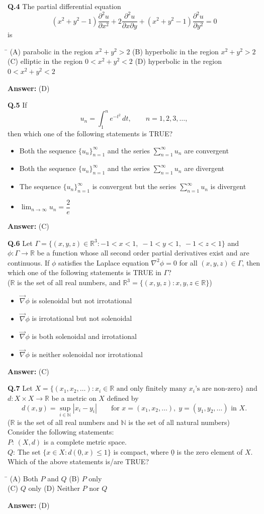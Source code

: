 \documentclass[11pt,a4paper]{article}
\newcommand{\optsfourA}[4]{%
  \begin{tabbing}
    \hspace{0.48\linewidth}\=\kill
    (A) #1 \> (B) #2 \\[2pt]
    (C) #3 \> (D) #4
  \end{tabbing}%
}
\newcommand{\optslistA}[4]{%
  \begin{itemize}
    \setlength{\itemsep}{2pt}\setlength{\parskip}{0pt}
    \item[(A)] #1
    \item[(B)] #2
    \item[(C)] #3
    \item[(D)] #4
  \end{itemize}%
}
\newcommand{\ans}[1]{\textbf{Answer:} #1\par\medskip}
\begin{document}
\textbf{Q.4} The partial differential equation
\[
  (x^2 + y^2 - 1)\frac{\partial^2 u}{\partial x^2} + 2\frac{\partial^2 u}{\partial x \partial y} + (x^2 + y^2 - 1)\frac{\partial^2 u}{\partial y^2} = 0
\]
is
\optsfourA{parabolic in the region $x^2 + y^2 > 2$}{hyperbolic in the region $x^2 + y^2 > 2$}{elliptic in the region $0 < x^2 + y^2 < 2$}{hyperbolic in the region $0 < x^2 + y^2 < 2$}
\ans{(D)}

\textbf{Q.5} If
\[
  u_n = \int_1^n e^{-t^2}\,dt, \qquad n = 1, 2, 3, \dots,
\]
then which one of the following statements is TRUE?
\optslistA{Both the sequence $\{u_n\}_{n=1}^{\infty}$ and the series $\sum_{n=1}^{\infty} u_n$ are convergent}{Both the sequence $\{u_n\}_{n=1}^{\infty}$ and the series $\sum_{n=1}^{\infty} u_n$ are divergent}{The sequence $\{u_n\}_{n=1}^{\infty}$ is convergent but the series $\sum_{n=1}^{\infty} u_n$ is divergent}{$\lim_{n\to\infty} u_n = \dfrac{2}{e}$}
\ans{(C)}

\textbf{Q.6} Let $\Gamma = \{(x, y, z) \in \mathbb{R}^3 : -1 < x < 1,\; -1 < y < 1,\; -1 < z < 1\}$ and $\phi : \Gamma \to \mathbb{R}$ be a function whose all second order partial derivatives exist and are continuous. If $\phi$ satisfies the Laplace equation $\nabla^2 \phi = 0$ for all $(x, y, z) \in \Gamma$, then which one of the following statements is TRUE in $\Gamma$?\\
($\mathbb{R}$ is the set of all real numbers, and $\mathbb{R}^3 = \{(x, y, z) : x, y, z \in \mathbb{R}\}$)
\optslistA{$\vec{\nabla}\phi$ is solenoidal but not irrotational}{$\vec{\nabla}\phi$ is irrotational but not solenoidal}{$\vec{\nabla}\phi$ is both solenoidal and irrotational}{$\vec{\nabla}\phi$ is neither solenoidal nor irrotational}
\ans{(C)}

\textbf{Q.7} Let $X = \{(x_1, x_2, \dots) : x_i \in \mathbb{R} \text{ and only finitely many } x_i\text{'s are non-zero}\}$ and $d : X \times X \to \mathbb{R}$ be a metric on $X$ defined by
\[
  d(x, y) = \sup_{i \in \mathbb{N}} |x_i - y_i| \qquad \text{for } x = (x_1, x_2, \dots),\; y = (y_1, y_2, \dots) \text{ in } X.
\]
($\mathbb{R}$ is the set of all real numbers and $\mathbb{N}$ is the set of all natural numbers)\\
Consider the following statements:\\
$P$: $(X, d)$ is a complete metric space.\\
$Q$: The set $\{x \in X : d(\underline{0}, x) \le 1\}$ is compact, where $\underline{0}$ is the zero element of $X$.\\
Which of the above statements is/are TRUE?
\optsfourA{Both $P$ and $Q$}{$P$ only}{$Q$ only}{Neither $P$ nor $Q$}
\ans{(D)}
\end{document}

